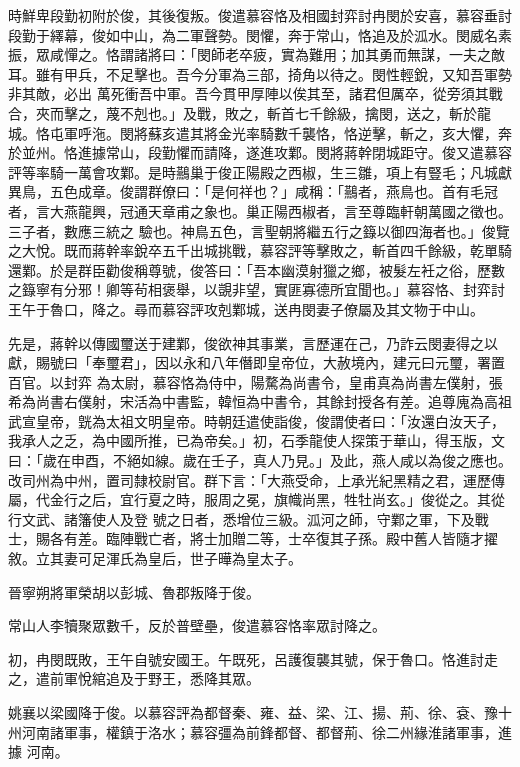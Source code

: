 \begin{pinyinscope}
 時鮮卑段勤初附於俊，其後復叛。俊遣慕容恪及相國封弈討冉閔於安喜，慕容垂討段勤于繹幕，俊如中山，為二軍聲勢。閔懼，奔于常山，恪追及於泒水。閔威名素振，眾咸憚之。恪謂諸將曰：「閔師老卒疲，實為難用；加其勇而無謀，一夫之敵耳。雖有甲兵，不足擊也。吾今分軍為三部，掎角以待之。閔性輕銳，又知吾軍勢非其敵，必出
 萬死衝吾中軍。吾今貫甲厚陣以俟其至，諸君但厲卒，從旁須其戰合，夾而擊之，蔑不剋也。」及戰，敗之，斬首七千餘級，擒閔，送之，斬於龍城。恪屯軍呼沲。閔將蘇亥遣其將金光率騎數千襲恪，恪逆擊，斬之，亥大懼，奔於並州。恪進據常山，段勤懼而請降，遂進攻鄴。閔將蔣幹閉城距守。俊又遣慕容評等率騎一萬會攻鄴。是時䴏巢于俊正陽殿之西椒，生三雛，項上有豎毛；凡城獻異鳥，五色成章。俊謂群僚曰：「是何祥也？」咸稱：「䴏者，燕鳥也。首有毛冠者，言大燕龍興，冠通天章甫之象也。巢正陽西椒者，言至尊臨軒朝萬國之徵也。三子者，數應三統之
 驗也。神鳥五色，言聖朝將繼五行之籙以御四海者也。」俊覽之大悅。既而蔣幹率銳卒五千出城挑戰，慕容評等擊敗之，斬首四千餘級，乾單騎還鄴。於是群臣勸俊稱尊號，俊答曰：「吾本幽漠射獵之鄉，被髮左衽之俗，歷數之籙寧有分邪！卿等茍相褒舉，以覬非望，實匪寡德所宜聞也。」慕容恪、封弈討王午于魯口，降之。尋而慕容評攻剋鄴城，送冉閔妻子僚屬及其文物于中山。



 先是，蔣幹以傳國璽送于建鄴，俊欲神其事業，言歷運在己，乃詐云閔妻得之以獻，賜號曰「奉璽君」，因以永和八年僭即皇帝位，大赦境內，建元曰元璽，署置百官。以封弈
 為太尉，慕容恪為侍中，陽騖為尚書令，皇甫真為尚書左僕射，張希為尚書右僕射，宋活為中書監，韓恒為中書令，其餘封授各有差。追尊廆為高祖武宣皇帝，皝為太祖文明皇帝。時朝廷遣使詣俊，俊謂使者曰：「汝還白汝天子，我承人之乏，為中國所推，已為帝矣。」初，石季龍使人探策于華山，得玉版，文曰：「歲在申酉，不絕如線。歲在壬子，真人乃見。」及此，燕人咸以為俊之應也。改司州為中州，置司隸校尉官。群下言：「大燕受命，上承光紀黑精之君，運歷傳屬，代金行之后，宜行夏之時，服周之冕，旗幟尚黑，牲牡尚玄。」俊從之。其從行文武、諸籓使人及登
 號之日者，悉增位三級。泒河之師，守鄴之軍，下及戰士，賜各有差。臨陣戰亡者，將士加贈二等，士卒復其子孫。殿中舊人皆隨才擢敘。立其妻可足渾氏為皇后，世子曄為皇太子。



 晉寧朔將軍榮胡以彭城、魯郡叛降于俊。



 常山人李犢聚眾數千，反於普壁壘，俊遣慕容恪率眾討降之。



 初，冉閔既敗，王午自號安國王。午既死，呂護復襲其號，保于魯口。恪進討走之，遣前軍悅綰追及于野王，悉降其眾。



 姚襄以梁國降于俊。以慕容評為都督秦、雍、益、梁、江、揚、荊、徐、袞、豫十州河南諸軍事，權鎮于洛水；慕容彊為前鋒都督、都督荊、徐二州緣淮諸軍事，進據
 河南。




\end{pinyinscope}
